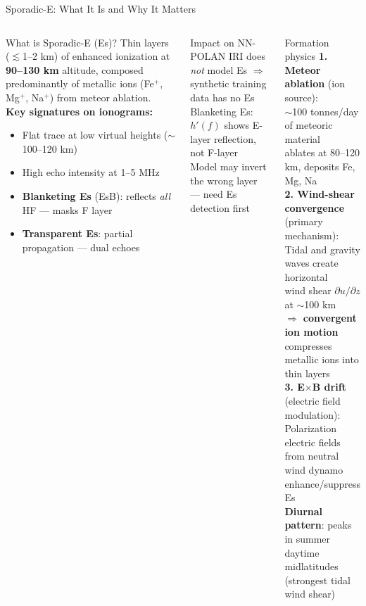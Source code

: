 \documentclass[aspectratio=169,10pt]{beamer}
\begin{document}
\begin{frame}{Sporadic-E: What It Is and Why It Matters}
\begin{columns}
\begin{block}{What is Sporadic-E (Es)?}
  \small
  Thin layers ($\lesssim$1--2 km) of enhanced ionization at \textbf{90--130 km}
  altitude, composed predominantly of metallic ions (Fe$^+$, Mg$^+$, Na$^+$)
  from meteor ablation.\\[4pt]
  \textbf{Key signatures on ionograms:}
  \begin{itemize}\scriptsize
    \item Flat trace at low virtual heights ($\sim$100--120 km)
    \item High echo intensity at 1--5 MHz
    \item \textbf{Blanketing Es} (EsB): reflects \emph{all} HF — masks F layer
    \item \textbf{Transparent Es}: partial propagation — dual echoes
  \end{itemize}
\end{block}
\vspace{3pt}
\begin{alertblock}{Impact on NN-POLAN}
  \scriptsize
  IRI does \emph{not} model Es $\Rightarrow$ synthetic training data has no Es\\
  Blanketing Es: $h'(f)$ shows E-layer reflection, not F-layer\\
  Model may invert the wrong layer — need Es detection first
\end{alertblock}

\begin{block}{Formation physics}
  \small
  \textbf{1. Meteor ablation} (ion source):\\
  \quad $\sim$100 tonnes/day of meteoric material\\
  \quad ablates at 80--120 km, deposits Fe, Mg, Na\\[4pt]
  \textbf{2. Wind-shear convergence} (primary mechanism):\\
  \quad Tidal and gravity waves create horizontal\\
  \quad wind shear $\partial u/\partial z$ at $\sim$100 km\\
  \quad $\Rightarrow$ \textbf{convergent ion motion} compresses\\
  \quad metallic ions into thin layers\\[4pt]
  \textbf{3. E$\times$B drift} (electric field modulation):\\
  \quad Polarization electric fields from neutral\\
  \quad wind dynamo enhance/suppress Es\\[4pt]
  \textbf{Diurnal pattern}: peaks in summer daytime\\
  \quad midlatitudes (strongest tidal wind shear)
\end{block}
\end{columns}
\end{frame}
\end{document}
